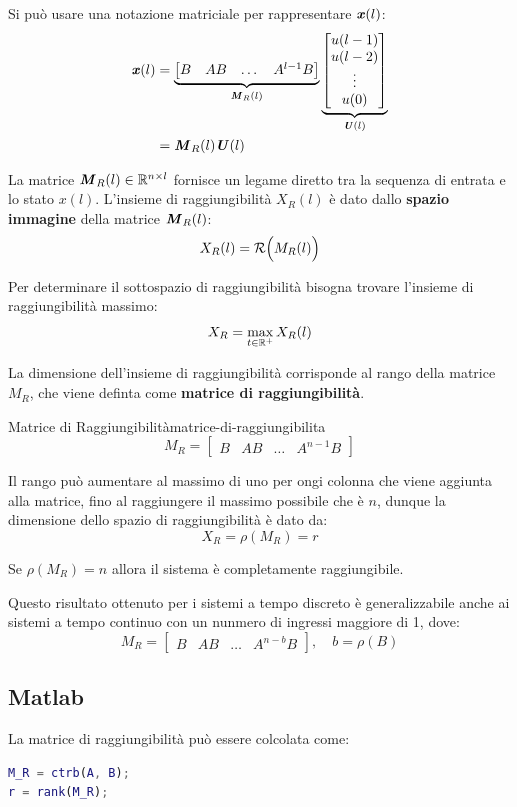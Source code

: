\documentclass[12pt]{article}
\begin{document}
Si pu\`o usare una notazione matriciale per rappresentare $\textbf{\textit{x}}(l)$:
\begin{align*}
\textbf{\textit{x}}(l)  & = \underbrace{\begin{bmatrix} 
        B & AB & \dots & A^{l-1}B
        \end{bmatrix}}_{\textbf{\textit{M}}_R(l)} \underbrace{\begin{bmatrix} 
    u(l-1) \\
    u(l-2) \\
    \vdots \\
    u(0)
\end{bmatrix} }_{\textbf{\textit{U}}(l)} \\
    & = \textbf{\textit{M}}_R(l) \textbf{\textit{U}}(l)
\end{align*}

La matrice $\textbf{\textit{M}}_R(l) \in \mathbb{R}^{n \times l}$ fornisce un legame diretto tra la sequenza di entrata e lo stato $x(l)$. L'insieme di raggiungibilit\`a $X_R(l)$ \`e dato dallo \textbf{spazio immagine} della matrice $\textbf{\textit{M}}_R(l)$:
\[ X_R(l) = \mathcal{R}\Bigl( M_R(l) \Bigr) \]

Per determinare il sottospazio di raggiungibilit\`a bisogna trovare l'insieme di raggiungibilit\`a massimo:
\[ X_R = \underset{t \in \mathbb{R}^{+}}{\max}\, X_R(l) \]

La dimensione dell'insieme di raggiungibilit\`a corrisponde al rango della matrice $M_R$, che viene definta come \textbf{matrice di raggiungibilit\`a}.
\begin{definition}{Matrice di Raggiungibilit\`a}{matrice-di-raggiungibilita}
\[ M_R = \begin{bmatrix} B & AB & \dots & A^{n-1}B \end{bmatrix}  \]
\end{definition}

Il rango pu\`o aumentare al  massimo di uno per ongi colonna che viene aggiunta alla matrice, fino al raggiungere il massimo possibile che \`e $n$, dunque la dimensione dello spazio di raggiungibilit\`a \`e dato da:
\[ X_R = \rho (M_R) = r \]

Se $\rho(M_R) = n$ allora il sistema \`e completamente raggiungibile.

Questo risultato ottenuto per i sistemi a tempo discreto \`e generalizzabile anche ai sistemi a tempo continuo con un nunmero di ingressi maggiore di 1, dove:
\[ M_R = \begin{bmatrix} B & AB & \dots & A^{n-b}B \end{bmatrix}, \quad b = \rho(B) \]

\subsection{Matlab}
La matrice di raggiungibilit\`a pu\`o essere colcolata come:
\begin{lstlisting}[language=matlab]
M_R = ctrb(A, B);
r = rank(M_R);
\end{lstlisting}
\end{document}
